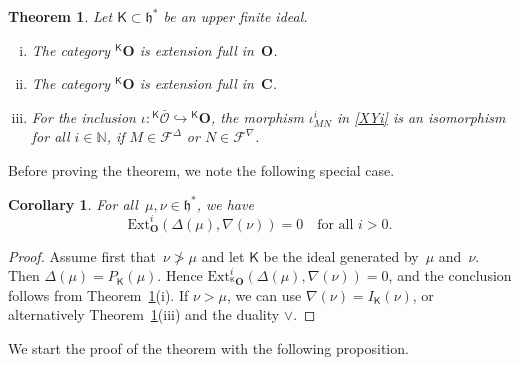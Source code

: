 \documentclass[11pt]{amsart}
\newcommand{\KKK}{\mathsf{K}}
\newcommand{\cF}{{\mathcal{F}}}
\newcommand{\cO}{\mathcal O}
\newcommand{\bO}{\mathbf{O}}
\newcommand{\bC}{\mathbf{C}}
\newcommand{\Ext}{\mathrm{Ext}}
\newcommand{\fh}{\mathfrak{h}}
\newcommand{\mN}{\mathbb{N}}
\numberwithin{equation}{section}
\theoremstyle{plain}
\newtheorem{cor}[subsubsection]{Corollary}
\newtheorem{thm}[subsubsection]{Theorem}
\theoremstyle{remark}
\theoremstyle{remark}
\theoremstyle{construction}
\begin{document}
\begin{thm}\label{ThmExtFull}
Let $\KKK\subset\fh^\ast$ be an upper finite ideal.
\begin{enumerate}[(i)]
\item The category ${}^{\KKK}\bO$ is extension full in~$\bO$.
\item The category ${}^{\KKK}\bO$ is extension full in~$\bC$.
\item For the inclusion $\iota:{}^{\KKK}\bar{\cO}\hookrightarrow {}^{\KKK}\bO$, the morphism $\iota^i_{MN}$ in \eqref{XYi} is an isomorphism for all $i\in\mN$, if $M\in\cF^\Delta$ or $N\in \cF^{\nabla}$.
\end{enumerate}
\end{thm}
Before proving the theorem, we note the following special case.
\begin{cor}
For all~$\mu,\nu\in \fh^\ast$, we have
$$\Ext^i_{\bO}(\Delta(\mu),\nabla(\nu))=0\quad\mbox{for all $i>0$.}$$
\end{cor}
\begin{proof}
Assume first that~$\nu\not>\mu$ and let $\KKK$ be the ideal generated by~$\mu$ and~$\nu$. Then $\Delta(\mu)=P_{\KKK}(\mu)${.} {Hence} $\Ext^i_{{}^{\KKK}\bO}(\Delta(\mu),\nabla(\nu))=0${,} and the conclusion follows from Theorem~\ref{ThmExtFull}(i). If $\nu>\mu$, we can use $\nabla(\nu)=I_{\KKK}(\nu)$, or alternatively Theorem~\ref{ThmExtFull}(iii) and the duality $\vee$.
\end{proof}



We start the proof of the theorem with the following proposition.
\end{document}

